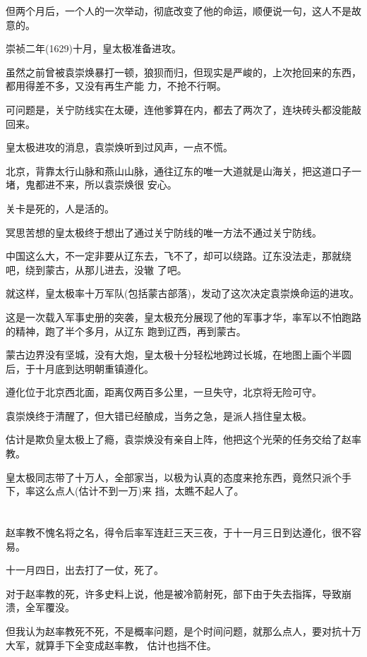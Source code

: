 \documentclass[11pt,a4paper,onecolumn]{article}
\begin{document}
但两个月后，一个人的一次举动，彻底改变了他的命运，顺便说一句，这人不是故意的。

崇祯二年(1629)十月，皇太极准备进攻。

虽然之前曾被袁崇焕暴打一顿，狼狈而归，但现实是严峻的，上次抢回来的东西，都用得差不多，又没有再生产能
力，不抢不行啊。

可问题是，关宁防线实在太硬，连他爹算在内，都去了两次了，连块砖头都没能敲回来。

皇太极进攻的消息，袁崇焕听到过风声，一点不慌。

北京，背靠太行山脉和燕山山脉，通往辽东的唯一大道就是山海关，把这道口子一堵，鬼都进不来，所以袁崇焕很
安心。

关卡是死的，人是活的。

冥思苦想的皇太极终于想出了通过关宁防线的唯一方法\myrule 不通过关宁防线。

中国这么大，不一定非要从辽东去，飞不了，却可以绕路。辽东没法走，那就绕吧，绕到蒙古，从那儿进去，没辙
了吧。

就这样，皇太极率十万军队(包括蒙古部落)，发动了这次决定袁崇焕命运的进攻。

这是一次载入军事史册的突袭，皇太极充分展现了他的军事才华，率军以不怕跑路的精神，跑了半个多月，从辽东
跑到辽西，再到蒙古。

蒙古边界没有坚城，没有大炮，皇太极十分轻松地跨过长城，在地图上画个半圆后，于十月底到达明朝重镇遵化。

遵化位于北京西北面，距离仅两百多公里，一旦失守，北京将无险可守。

袁崇焕终于清醒了，但大错已经酿成，当务之急，是派人挡住皇太极。

估计是欺负皇太极上了瘾，袁崇焕没有亲自上阵，他把这个光荣的任务交给了赵率教。

皇太极同志带了十万人，全部家当，以极为认真的态度来抢东西，竟然只派个手下，率这么点人(估计不到一万)来
挡，太瞧不起人了。

\section[\thesection]{}

赵率教不愧名将之名，得令后率军连赶三天三夜，于十一月三日到达遵化，很不容易。

十一月四日，出去打了一仗，死了。

对于赵率教的死，许多史料上说，他是被冷箭射死，部下由于失去指挥，导致崩溃，全军覆没。

但我认为赵率教死不死，不是概率问题，是个时间问题，就那么点人，要对抗十万大军，就算手下全变成赵率教，
估计也挡不住。
\end{document}
